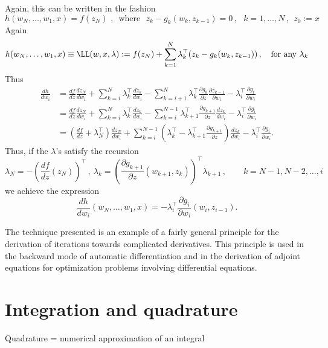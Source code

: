 Again, this can be written in the fashion
\[
h(w_N,\ldots, w_1,x)=f(z_{N})\text{ ,~ where~ }z_k-g_k(w_k,z_{k-1})=0\, , ~~~k=1,\ldots,N\, , ~~z_0:=x
\]
Again
\[
h(w_N,\ldots, w_1,x)\equiv
\LL(w,x,\lambda):=f(z_N)+\sum_{k=1}^N\lambda_k^\top(z_k-g_k(w_k,z_{k-1}))\, ,
\text{~~ for any }\lambda_k
\]
Thus
\begin{align*}
\frac{dh}{dw_i}&=\frac{df}{dz}\frac{dz_N}{dw_i}+
\sum_{k=i}^N\lambda_k^\top\frac{dz_k}{dw_i}-\sum_{k=i+1}^N\lambda_k^\top\frac{\partial g_k}{\partial z}\frac{\partial z_{k-1}}{\partial w_i} -\lambda_i^\top\frac{\partial g_i}{\partial w_i}\\
&=\frac{df}{dz}\frac{dz_N}{dw_i}+
\sum_{k=i}^N\lambda_k^\top\frac{dz_k}{dw_i}-\sum_{k=i}^{N-1}\lambda_{k+1}^\top\frac{\partial g_{k+1}}{\partial z}\frac{dz_{k}}{dw_i} -\lambda_i^\top\frac{\partial g_i}{\partial w_i}\\
&=\left(\frac{df}{dz}+\lambda_N^\top\right)\frac{dz_N}{dw_i}+
\sum_{k=i}^{N-1}\left(\lambda_k^\top-\lambda_{k+1}^\top\frac{\partial g_{k+1}}{\partial z}\right)\frac{dz_{k}}{dw_i} -\lambda_i^\top\frac{\partial g_i}{\partial w_i}.
\end{align*}
Thus, if the $\lambda$'s satisfy the recursion
\[
\lambda_N=-\left(\frac{df}{dz}(z_N)\right)^\top\, ,\ 
\lambda_k=\left(\frac{\partial g_{k+1}}{\partial z}(w_{k+1},z_k)\right)^\top \lambda_{k+1}\, ,\qquad 
k=N-1,N-2,\ldots, i
\]
we achieve the expression
\[
\frac{dh}{dw_i}(w_N,\ldots, w_1,x)= -\lambda_i^\top\frac{\partial g_i}{\partial w_i}(w_i,z_{i-1}).
\]

\begin{remark}
	The technique presented is an example of a fairly general principle for the derivation of iterations towards complicated derivatives. This principle is used in the backward mode of automatic differentiation and in the derivation of adjoint equations for optimization problems involving differential equations.
\end{remark}



\section{Integration and quadrature}

Quadrature = numerical approximation of an integral  

